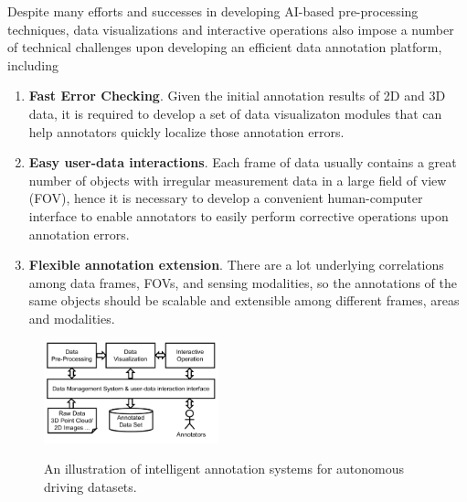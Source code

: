 \documentclass[letterpaper, 10 pt, conference]{ieeeconf}  %
\begin{document}
Despite many efforts and successes in developing AI-based pre-processing techniques, data visualizations and interactive operations also impose a number of technical challenges upon developing an efficient data annotation platform, including
\begin{enumerate}

\item \textbf{Fast Error Checking}. Given the initial annotation results of 2D and 3D data, it is required to develop a set of data visualizaton modules that can help annotators quickly localize those annotation errors. 
\item \textbf{Easy user-data interactions}. Each frame of data usually contains a great number of objects with irregular measurement data in a large field of view (FOV), hence it is necessary to develop a convenient human-computer interface to enable annotators to easily perform corrective operations upon annotation errors.
\item \textbf{Flexible annotation extension}. There are a lot underlying correlations among data frames, FOVs, and sensing modalities, so the annotations of the same objects should be scalable and extensible among different frames, areas and modalities.

\end{enumerate}




\begin{figure}[tp]
	\centering
	\includegraphics[width=0.45\textwidth]{./platform-simple2}\\ %
	\caption{An illustration of intelligent annotation systems for autonomous driving datasets.}
	\label{fig:main-arch}
	\vspace{-0.3cm}
\end{figure}
\end{document}
